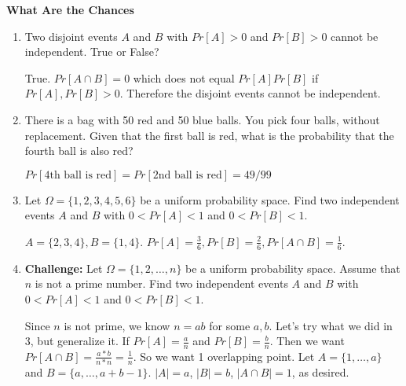 \question \textbf{What Are the Chances}
\begin{enumerate}[label=(\alph*)]
\item Two disjoint events $A$ and $B$ with $Pr[A] > 0$ and $Pr[B] > 0$ cannot be independent. True or False?
\begin{solution}
True. $Pr[A \cap B] = 0$ which does not equal $Pr[A]Pr[B]$ if $Pr[A], Pr[B] > 0$. Therefore the disjoint events cannot be independent.
\end{solution}

\item There is a bag with 50 red and 50 blue balls. You pick four balls, without replacement. Given that the first ball is red, what is the probability that the fourth ball is also red?
\begin{solution}
$Pr[\text{4th ball is red}] = Pr[\text{2nd ball is red}] = 49/99$
\end{solution}

\item Let $\Omega = \{1,2,3,4,5,6\}$ be a uniform probability space. Find two independent events $A$ and $B$ with $0 < Pr[A] < 1$ and $0 < Pr[B] < 1$.
\begin{solution}
$A = \{2, 3, 4\}, B=\{1, 4\}.$\newline
$Pr[A] = \frac{3}{6}, Pr[B] = \frac{2}{6}, Pr[A \cap B] = \frac{1}{6}.$
\end{solution}

\item \textbf{Challenge:} Let $\Omega = \{1,2, \dotsc, n\}$ be a uniform probability space. Assume that $n$ is not a prime number. Find two independent events $A$ and $B$ with $0 < Pr[A] < 1$ and $0 < Pr[B] < 1$.
\begin{solution}
Since $n$ is not prime, we know $n=ab$ for some $a,b$. Let’s try what we did in 3, but generalize it. If $Pr[A] = \frac{a}{n}$ and $Pr[B] = \frac{b}{n}$. Then we want $Pr[A \cap B] = \frac{a*b}{n*n} = \frac{1}{n}$. So we want 1 overlapping point. Let $A=\{1, \dotsc, a\}$ and $B=\{a, \dotsc, a+b-1\}$. $|A| = a$, $|B| = b$, $|A \cap B|=1$, as desired.
\end{solution}
\end{enumerate}